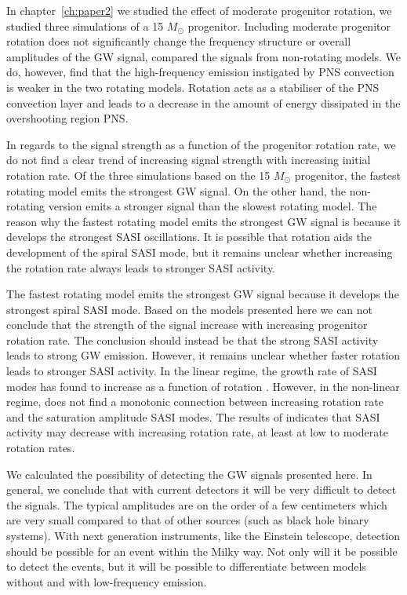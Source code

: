 In chapter~\ref{ch:paper2} we studied the effect of moderate progenitor rotation, we studied three simulations 
of a 15 $M_\odot$ progenitor.
Including moderate progenitor rotation does not significantly change the frequency structure or overall amplitudes of the GW signal, 
compared the signals from non-rotating models. We do, however, find that the high-frequency emission instigated by PNS convection is weaker in the two rotating models. Rotation acts as a stabiliser of the PNS convection layer and leads to a decrease in the amount of energy dissipated in the overshooting region PNS. 

In regards to the signal strength as a function of the progenitor rotation rate, we do not find
a clear trend of increasing signal strength with increasing initial rotation rate.
Of the three simulations based on the 15 $M_\odot$ progenitor, the fastest rotating model emits the strongest GW signal. On the other hand,
the non-rotating version emits a stronger signal than the slowest rotating model.
The reason why the fastest rotating model emits the strongest GW signal is because it develops the strongest SASI oscillations.
It is possible that rotation aids the development of the spiral SASI mode, but it remains unclear
whether increasing the rotation rate always leads to stronger SASI activity.

The fastest rotating model emits the strongest GW signal because it develops the strongest spiral SASI mode. Based on the models presented here we can not conclude
that the strength of the signal increase with increasing progenitor rotation rate. The conclusion should instead be
that the strong SASI activity leads to strong GW emission. However, it remains unclear
whether faster rotation leads to stronger SASI activity. In the linear regime, the growth rate of SASI modes has found to
increase as a function of rotation \citep{yamasaki_08,blondin_17}. However, in the non-linear regime, \cite{kazeroni_17} does not find a 
monotonic connection between increasing rotation rate and the saturation amplitude SASI modes. The results of \cite{kazeroni_17} indicates that
SASI activity may decrease with increasing rotation rate, at least at low to moderate rotation rates. 

We calculated the possibility of detecting the GW signals presented here. In general, we conclude that with current detectors it will be very difficult to detect the signals. The typical amplitudes are
on the order of a few centimeters which are very small compared to that of other sources (such as black hole binary systems).
With next generation instruments, like the Einstein telescope, detection should be possible for an event within the 
Milky way. Not only will it be possible to detect the events, but it will be possible to
differentiate between models without and with low-frequency emission.

